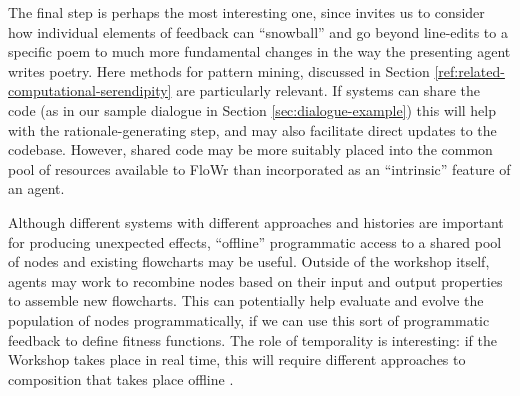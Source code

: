 The final step is perhaps the most interesting one, since invites us
to consider how individual elements of feedback can ``snowball'' and
go beyond line-edits to a specific poem to much more fundamental
changes in the way the presenting agent writes poetry.  Here methods
for pattern mining, discussed in Section
\ref{ref:related-computational-serendipity} are particularly relevant.
If systems can share the code (as in our sample dialogue in Section
\ref{sec:dialogue-example}) this will help with the
rationale-generating step, and may also facilitate direct updates to
the codebase.  However, shared code may be more suitably placed into
the common pool of resources available to FloWr than incorporated as
an ``intrinsic'' feature of an agent.

Although different systems with different approaches and histories are
important for producing unexpected effects, ``offline'' programmatic
access to a shared pool of nodes and existing flowcharts may be
useful.  Outside of the workshop itself, agents may work to recombine
nodes based on their input and output properties to assemble new
flowcharts.  This can potentially help evaluate and evolve the
population of nodes programmatically, if we can use this sort of
programmatic feedback to define fitness functions.  The role of
temporality is interesting: if the Workshop takes place in real time,
this will require different approaches to composition that takes place
offline \cite{perez2013rolling}.
